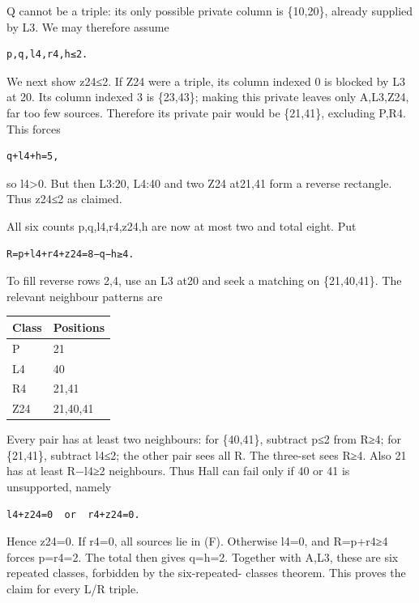 \documentclass[
  10pt,
]{article}
\begin{document}
Q cannot be a triple: its only possible private column is \{10,20\},
already supplied by L3. We may therefore assume

\begin{verbatim}
p,q,l4,r4,h≤2.
\end{verbatim}

We next show z24≤2. If Z24 were a triple, its column indexed 0 is
blocked by L3 at 20. Its column indexed 3 is \{23,43\}; making this
private leaves only A,L3,Z24, far too few sources. Therefore its private
pair would be \{21,41\}, excluding P,R4. This forces

\begin{verbatim}
q+l4+h=5,
\end{verbatim}

so l4\textgreater0. But then L3:20, L4:40 and two Z24 at21,41 form a
reverse rectangle. Thus z24≤2 as claimed.

All six counts p,q,l4,r4,z24,h are now at most two and total eight. Put

\begin{verbatim}
R=p+l4+r4+z24=8−q−h≥4.
\end{verbatim}

To fill reverse rows 2,4, use an L3 at20 and seek a matching on
\{21,40,41\}. The relevant neighbour patterns are

\begin{longtable}[]{@{}ll@{}}
\toprule\noalign{}
Class & Positions \\
\midrule\noalign{}
\endhead
\bottomrule\noalign{}
\endlastfoot
P & 21 \\
L4 & 40 \\
R4 & 21,41 \\
Z24 & 21,40,41 \\
\end{longtable}

Every pair has at least two neighbours: for \{40,41\}, subtract p≤2 from
R≥4; for \{21,41\}, subtract l4≤2; the other pair sees all R. The
three-set sees R≥4. Also 21 has at least R−l4≥2 neighbours. Thus Hall
can fail only if 40 or 41 is unsupported, namely

\begin{verbatim}
l4+z24=0  or  r4+z24=0.
\end{verbatim}

Hence z24=0. If r4=0, all sources lie in (F). Otherwise l4=0, and
R=p+r4≥4 forces p=r4=2. The total then gives q=h=2. Together with A,L3,
these are six repeated classes, forbidden by the six-repeated- classes
theorem. This proves the claim for every L/R triple.
\end{document}
